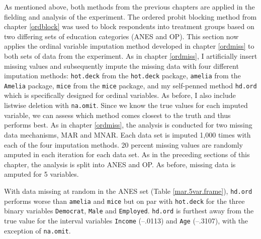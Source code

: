 \documentclass[12pt,econ]{sources/authesis}
\begin{document}
As mentioned above, both methods from the previous chapters are applied in the fielding and analysis of the experiment. The ordered probit blocking method from chapter \ref{ordblock} was used to block respondents into treatment groups based on two differing sets of education categories (ANES and OP). This section now applies the ordinal variable imputation method developed in chapter \ref{ordmiss} to both sets of data from the experiment. As in chapter \ref{ordmiss}, I artificially insert missing values and subsequently impute the missing data with four different imputation methods: \texttt{hot.deck} from the \texttt{hot.deck} package, \texttt{amelia} from the \texttt{Amelia} package, \texttt{mice} from the \texttt{mice} package, and my self-penned method \texttt{hd.ord} which is specifically designed for ordinal variables. As before, I also include listwise deletion with \texttt{na.omit}. Since we know the true values for each imputed variable, we can assess which method comes closest to the truth and thus performs best. As in chapter \ref{ordmiss}, the analysis is conducted for two missing data mechanisms, MAR and MNAR. Each data set is imputed 1,000 times with each of the four imputation methods. 20 percent missing values are randomly amputed in each iteration for each data set. As in the preceding sections of this chapter, the analysis is split into ANES and OP. As before, missing data is amputed for 5 variables.

\dsp

With data missing at random in the ANES set (Table \ref{mar.5var.frame}), \texttt{hd.ord} performs worse than \texttt{amelia} and \texttt{mice} but on par with \texttt{hot.deck} for the three binary variables \texttt{Democrat}, \texttt{Male} and \texttt{Employed}. \texttt{hd.ord} is furthest away from the true value for the interval variables \texttt{Income} (--.0113) and \texttt{Age} (--.3107), with the exception of \texttt{na.omit}.
\end{document}
